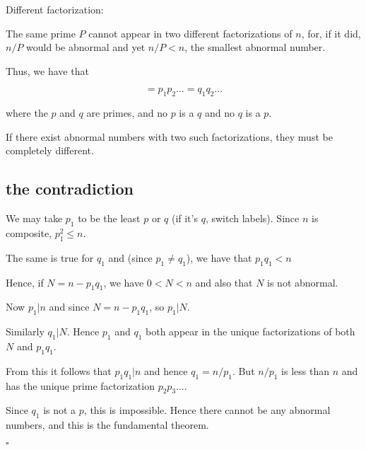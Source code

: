\documentclass[11pt, oneside]{article}
\begin{document}
Different factorization:

The same prime $P$ cannot appear in two different factorizations of $n$, for, if it did, $n/P$ would be abnormal and yet $n/P < n$, the smallest abnormal number.

Thus, we have that

\[  = p_1 p_2 \dots = q_1 q_2 \dots \]
    
where the $p$ and $q$ are primes, and no $p$ is a $q$ and no $q$ is a $p$.

If there exist abnormal numbers with two such factorizations, they must be completely different.

\subsection*{the contradiction}

We may take $p_1$ to be the least $p$ or $q$ (if it's $q$, switch labels).  Since $n$ is composite, $p_1^2 \le n$.

The same is true for $q_1$ and (since $p_1 \ne q_1$), we have that $p_1 q_1 < n$

Hence, if $N = n - p_1 q_1$, we have $0 < N < n$ and also that $N$ is not abnormal.

Now $p_1 | n$ and since $N = n - p_1 q_1$, so $p_1 | N$.

Similarly $q_1 | N$.  Hence $p_1$ and $q_1$ both appear in the unique factorizations of both $N$ and $p_1 q_1$.

From this it follows that $p_1 q_1 | n$ and hence $q_1 = n/p_1$.  But $n/p_1$ is less than $n$ and has the unique prime factorization $p_2 p_3 \dots$.

Since $q_1$ is not a $p$, this is impossible.  Hence there cannot be any abnormal numbers, and this is the fundamental theorem.

$\square$
\end{document}
